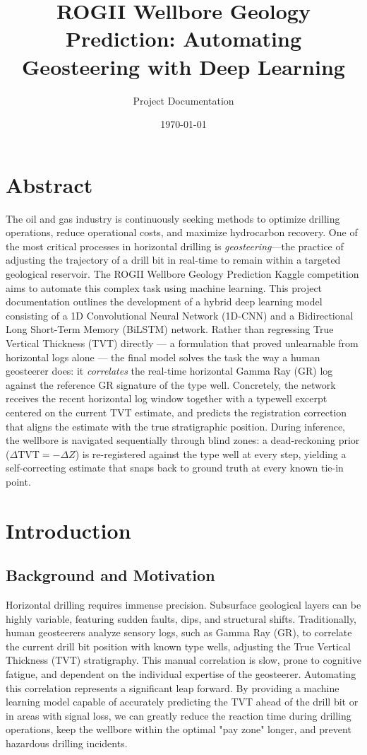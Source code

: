 \documentclass[12pt, a4paper]{article}
\title{\textbf{ROGII Wellbore Geology Prediction: Automating Geosteering with Deep Learning}}
\author{Project Documentation}
\date{\today}
\begin{document}
    \maketitle
    \tableofcontents
    \newpage

    \section{Abstract}
    The oil and gas industry is continuously seeking methods to optimize drilling operations, reduce operational costs, and maximize hydrocarbon recovery. One of the most critical processes in horizontal drilling is \textit{geosteering}---the practice of adjusting the trajectory of a drill bit in real-time to remain within a targeted geological reservoir. The ROGII Wellbore Geology Prediction Kaggle competition aims to automate this complex task using machine learning. This project documentation outlines the development of a hybrid deep learning model consisting of a 1D Convolutional Neural Network (1D-CNN) and a Bidirectional Long Short-Term Memory (BiLSTM) network. Rather than regressing True Vertical Thickness (TVT) directly --- a formulation that proved unlearnable from horizontal logs alone --- the final model solves the task the way a human geosteerer does: it \textit{correlates} the real-time horizontal Gamma Ray (GR) log against the reference GR signature of the type well. Concretely, the network receives the recent horizontal log window together with a typewell excerpt centered on the current TVT estimate, and predicts the registration correction that aligns the estimate with the true stratigraphic position. During inference, the wellbore is navigated sequentially through blind zones: a dead-reckoning prior ($\Delta \text{TVT} = -\Delta Z$) is re-registered against the type well at every step, yielding a self-correcting estimate that snaps back to ground truth at every known tie-in point.

    \section{Introduction}

    \subsection{Background and Motivation}
    Horizontal drilling requires immense precision. Subsurface geological layers can be highly variable, featuring sudden faults, dips, and structural shifts. Traditionally, human geosteerers analyze sensory logs, such as Gamma Ray (GR), to correlate the current drill bit position with known type wells, adjusting the True Vertical Thickness (TVT) stratigraphy. This manual correlation is slow, prone to cognitive fatigue, and dependent on the individual expertise of the geosteerer. Automating this correlation represents a significant leap forward. By providing a machine learning model capable of accurately predicting the TVT ahead of the drill bit or in areas with signal loss, we can greatly reduce the reaction time during drilling operations, keep the wellbore within the optimal "pay zone" longer, and prevent hazardous drilling incidents.
\end{document}
